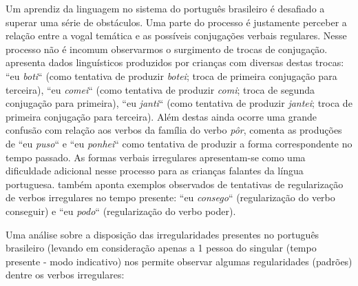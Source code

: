 Um aprendiz da linguagem no sistema do português brasileiro é desafiado a superar uma série de obstáculos.  Uma parte do processo é justamente perceber a relação entre a vogal temática e as possíveis conjugações verbais regulares. Nesse processo não é incomum observarmos o surgimento de trocas de conjugação. \cite{wuerges:2014} apresenta dados linguísticos produzidos por crianças com diversas destas trocas: “eu \textit{boti}“ (como tentativa de produzir \textit{botei}; troca de primeira conjugação para terceira), “eu \textit{comei}“ (como tentativa de produzir \textit{comi}; troca de segunda conjugação para primeira), “eu \textit{janti}“ (como tentativa de produzir \textit{jantei}; troca de primeira conjugação para terceira). Além destas ainda ocorre uma grande confusão com relação aos verbos da família do verbo \textit{pôr}, \cite{wuerges:2014} comenta as produções de “eu \textit{puso}“ e “eu \textit{ponhei}“ como tentativa de produzir a forma correspondente no tempo passado.  As formas verbais irregulares apresentam-se como uma dificuldade adicional nesse processo para as crianças falantes da língua portuguesa. \cite{wuerges:2014} também aponta exemplos observados de tentativas de regularização de verbos irregulares no tempo presente: “eu \textit{consego}“ (regularização do verbo conseguir) e “eu \textit{podo}“ (regularização do verbo poder). 


Uma análise sobre a disposição das irregularidades presentes no português brasileiro (levando em consideração apenas a 1 pessoa do singular (tempo presente - modo indicativo) nos permite observar algumas regularidades (padrões) dentre os verbos irregulares:\\

